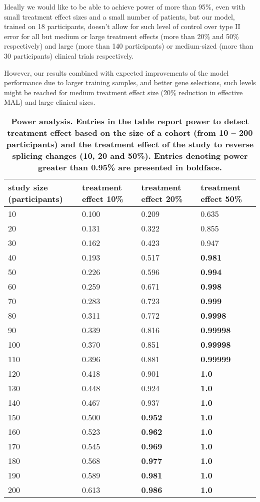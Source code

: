\documentclass[10pt,letterpaper]{article}
\begin{document}
Ideally we would like to be able to achieve power of more than 95\%, even with small treatment effect sizes and a small number of patients, but our model, trained on 18 participants, doesn't allow for such level of control over type II error for all but medium or large treatment effects (more than 20\% and 50\% respectively) and large (more than 140 participants) or medium-sized (more than 30 participants) clinical trials respectively.

However, our results combined with expected improvements of the model performance due to larger training samples, and better gene selections, such levels might be reached for medium treatment effect size (20\% reduction in effective MAL) and large clinical sizes.


\begin{table}[!ht]
\begin{adjustwidth}{-2.25in}{0in} %
\centering
\caption{{\bf Power analysis. Entries in the table report power to detect treatment effect based on the size of a cohort (from 10 -- 200 participants) and the treatment effect of the study to reverse splicing changes (10, 20 and 50\%). Entries denoting power greater than 0.95\% are presented in boldface.}}

\begin{tabular}{|l|l|l|l|}
\hline
study size (participants) & treatment effect 10\% & treatment effect 20\% & treatment effect 50\%  \\ \hline
10 & 0.100 & 0.209 & 0.635 \\ \hline
20 & 0.131 & 0.322 & 0.855 \\ \hline
30 & 0.162 & 0.423 & 0.947 \\ \hline
40 & 0.193 & 0.517 & {\bf 0.981} \\ \hline
50 & 0.226 & 0.596 & {\bf 0.994} \\ \hline
60 & 0.259 & 0.671 & {\bf 0.998} \\ \hline
70 & 0.283 & 0.723 & {\bf 0.999} \\ \hline
80 & 0.311 & 0.772 & {\bf 0.9998} \\ \hline
90 & 0.339 & 0.816 & {\bf 0.99998} \\ \hline
100 & 0.370 & 0.851 & {\bf 0.99998} \\ \hline
110 & 0.396 & 0.881 & {\bf 0.99999} \\ \hline
120 & 0.418 & 0.901 & {\bf 1.0} \\ \hline
130 & 0.448 & 0.924 & {\bf 1.0} \\ \hline
140 & 0.467 & 0.937 & {\bf 1.0} \\ \hline
150 & 0.500 & {\bf 0.952} & {\bf 1.0} \\ \hline
160 & 0.523 & {\bf 0.962} & {\bf 1.0} \\ \hline
170 & 0.545 & {\bf 0.969} & {\bf 1.0} \\ \hline
180 & 0.568 & {\bf 0.977} & {\bf 1.0} \\ \hline
190 & 0.589 & {\bf 0.981} & {\bf 1.0} \\ \hline
200 & 0.613 & {\bf 0.986} & {\bf 1.0} \\ \hline
\end{tabular}


\end{adjustwidth}
\end{table}
\end{document}
